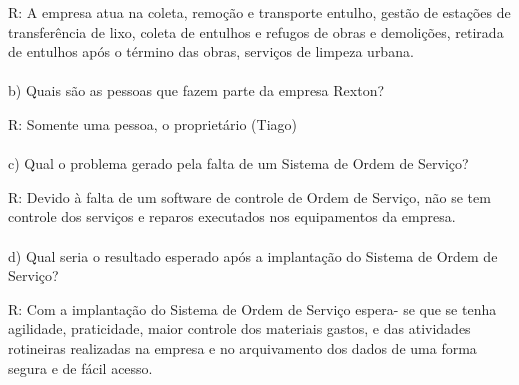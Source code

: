 \linebreak
R: A empresa atua na coleta, remoção e transporte entulho, gestão de estações de transferência de lixo, coleta de entulhos e refugos de obras e demolições, retirada de entulhos após o término das obras, serviços de limpeza urbana.
\\
\\
b) Quais são as pessoas que fazem parte da empresa Rexton?

\linebreak
R: Somente uma pessoa, o proprietário (Tiago)
\\
\\
c) Qual o problema gerado pela falta de um Sistema de Ordem de Serviço?

\linebreak
R: Devido à falta de um software de controle de Ordem de Serviço, não se tem controle dos serviços e reparos executados nos equipamentos da empresa.
\\
\\
d) Qual seria o resultado esperado após a implantação do Sistema de Ordem de Serviço?

\linebreak
R: Com a implantação do Sistema de Ordem de Serviço espera- se que se tenha agilidade, praticidade, maior controle dos materiais gastos, e das atividades rotineiras realizadas na empresa e no arquivamento dos dados de uma forma segura e de fácil acesso.
\\
\\